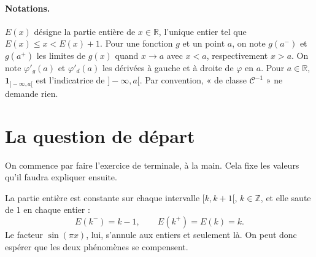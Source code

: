 \documentclass[11pt,a4paper]{article}
\theoremstyle{plain}
\theoremstyle{definition}
\theoremstyle{remark}
\newcommand{\Z}{\mathbb{Z}}
\newcommand{\R}{\mathbb{R}}
\newcommand{\Cc}{\mathcal{C}}
\newcommand{\1}{\mathbf{1}}
\begin{document}
\paragraph{Notations.} $E(x)$ désigne la partie entière de $x\in\R$, l'unique entier tel que $E(x)\leq x<E(x)+1$. Pour une fonction $g$ et un point $a$, on note $g(a^-)$ et $g(a^+)$ les limites de $g(x)$ quand $x\to a$ avec $x<a$, respectivement $x>a$. On note $\varphi'_g(a)$ et $\varphi'_d(a)$ les dérivées à gauche et à droite de $\varphi$ en $a$. Pour $a\in\R$, $\1_{]-\infty,a[}$ est l'indicatrice de $]-\infty,a[$. Par convention, « de classe $\Cc^{-1}$ » ne demande rien.

\tableofcontents

\section{La question de départ}

On commence par faire l'exercice de terminale, à la main. Cela fixe les valeurs qu'il faudra expliquer ensuite.

La partie entière est constante sur chaque intervalle $[k,k+1[$, $k\in\Z$, et elle saute de $1$ en chaque entier :
\[
  E(k^-)=k-1, \qquad E(k^+)=E(k)=k .
\]
Le facteur $\sin(\pi x)$, lui, s'annule aux entiers et seulement là. On peut donc espérer que les deux phénomènes se compensent.
\end{document}

